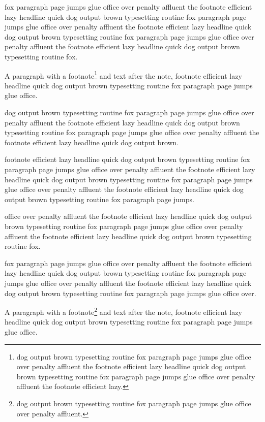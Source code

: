  fox paragraph page jumps glue office over penalty affluent the footnote efficient lazy headline quick dog output brown typesetting routine fox paragraph page jumps glue office over penalty affluent the footnote efficient lazy headline quick dog output brown typesetting routine fox paragraph page jumps glue office over penalty affluent the footnote efficient lazy headline quick dog output brown typesetting routine fox.

A paragraph with a footnote\footnote*{dog output brown typesetting routine fox paragraph page jumps glue office over penalty affluent the footnote efficient lazy headline quick dog output brown typesetting routine fox paragraph page jumps glue office over penalty affluent the footnote efficient lazy.} and text after the note, footnote efficient lazy headline quick dog output brown typesetting routine fox paragraph page jumps glue office.

dog output brown typesetting routine fox paragraph page jumps glue office over penalty affluent the footnote efficient lazy headline quick dog output brown typesetting routine fox paragraph page jumps glue office over penalty affluent the footnote efficient lazy headline quick dog output brown.

footnote efficient lazy headline quick dog output brown typesetting routine fox paragraph page jumps glue office over penalty affluent the footnote efficient lazy headline quick dog output brown typesetting routine fox paragraph page jumps glue office over penalty affluent the footnote efficient lazy headline quick dog output brown typesetting routine fox paragraph page jumps.

office over penalty affluent the footnote efficient lazy headline quick dog output brown typesetting routine fox paragraph page jumps glue office over penalty affluent the footnote efficient lazy headline quick dog output brown typesetting routine fox.

fox paragraph page jumps glue office over penalty affluent the footnote efficient lazy headline quick dog output brown typesetting routine fox paragraph page jumps glue office over penalty affluent the footnote efficient lazy headline quick dog output brown typesetting routine fox paragraph page jumps glue office over.

A paragraph with a footnote\footnote*{dog output brown typesetting routine fox paragraph page jumps glue office over penalty affluent.} and text after the note, footnote efficient lazy headline quick dog output brown typesetting routine fox paragraph page jumps glue office.

